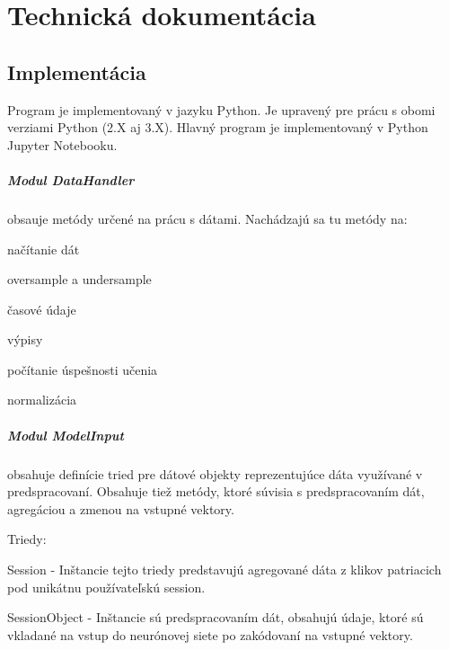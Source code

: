 
\chapter{Technická dokumentácia}
\label{technicka_dokumentacia}
\section{Implementácia}

Program je implementovaný v jazyku Python. Je upravený pre prácu s obomi verziami Python (2.X aj 3.X). Hlavný program je implementovaný v Python Jupyter Notebooku.

\paragraph{Modul DataHandler}
obsauje metódy určené na prácu s dátami. Nachádzajú sa tu metódy na:
\begin{my_itemize}
	\item{načítanie dát}
	\item{oversample a undersample}
	\item{časové údaje}
	\item{výpisy}
	\item{počítanie úspešnosti učenia}
	\item{normalizácia}
\end{my_itemize} 

\paragraph{Modul ModelInput}
obsahuje definície tried pre dátové objekty reprezentujúce dáta využívané v predspracovaní. Obsahuje tiež metódy, ktoré súvisia s predspracovaním dát, agregáciou a zmenou na vstupné vektory.

Triedy:
\begin{my_itemize}
	\item{Session} - Inštancie tejto triedy predstavujú agregované dáta z klikov patriacich pod unikátnu používateľskú session.
	\item{SessionObject} - Inštancie sú predspracovaním dát, obsahujú údaje, ktoré sú vkladané na vstup do neurónovej siete po zakódovaní na vstupné vektory.
\end{my_itemize}

